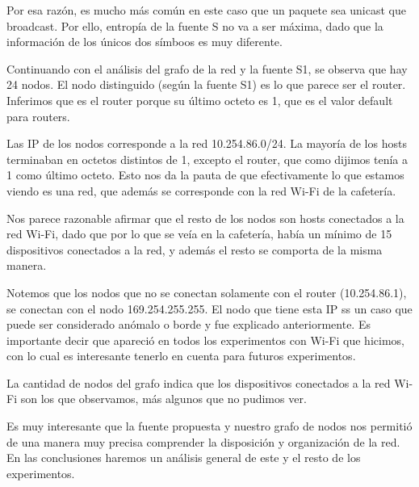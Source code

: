 Por esa razón, es mucho más común en este caso que un paquete sea unicast que broadcast. Por ello, entropía de la fuente S no va a ser máxima, dado que la información de los únicos dos símboos es muy diferente.

Continuando con el análisis del grafo de la red y la fuente S1, se observa que hay 24 nodos. El nodo distinguido (según la fuente S1) es lo que parece ser el router. Inferimos que es el router porque su último octeto es 1, que es el valor default para routers. 


Las IP de los nodos corresponde a la red 10.254.86.0/24. La mayoría de los hosts terminaban en octetos distintos de 1, excepto el router, que como dijimos tenía a 1 como último octeto. Esto nos da la pauta de que efectivamente lo que estamos viendo es una red, que además se corresponde con la red Wi-Fi de la cafetería.

Nos parece razonable afirmar que el resto de los nodos son hosts conectados a la red Wi-Fi, dado que por lo que se veía en la cafetería, había un mínimo de 15 dispositivos conectados a la red, y además el resto se comporta de la misma manera. 

Notemos que los nodos que no se conectan solamente con el router (10.254.86.1), se conectan con el nodo 169.254.255.255. El nodo que tiene esta IP ss un caso que puede ser considerado anómalo o borde y fue explicado anteriormente. Es importante decir que apareció en todos los experimentos con Wi-Fi que hicimos, con lo cual es interesante tenerlo en cuenta para futuros experimentos.


La cantidad de nodos del grafo indica que los dispositivos conectados a la red Wi-Fi son los que observamos, más algunos que no pudimos ver.

Es muy interesante que la fuente propuesta y nuestro grafo de nodos nos permitió de una manera muy precisa comprender la disposición y organización de la red. En las conclusiones haremos un análisis general de este y el resto de los experimentos.






